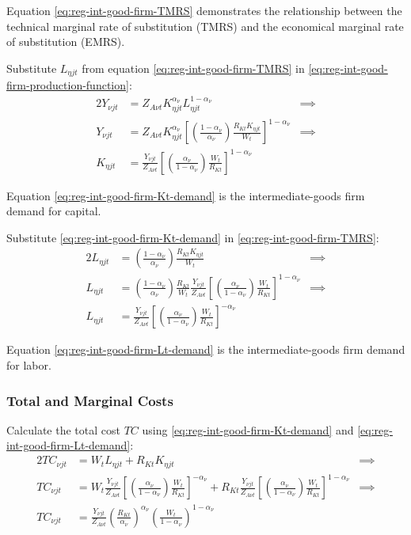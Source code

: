 \documentclass[
thesis.tex
]{subfiles}
\begin{document}
Equation \ref{eq:reg-int-good-firm-TMRS} demonstrates the relationship between the technical marginal rate of substitution (TMRS) and the economical marginal rate of substitution (EMRS). 

Substitute $L_{\eta jt}$ from equation \ref{eq:reg-int-good-firm-TMRS} in \ref{eq:reg-int-good-firm-production-function}:
\begin{alignat}{2}
	Y_{\nu jt} & = Z_{A\nu t} K_{\eta jt}^{\alpha_\nu} L_{\eta jt}^{1-{\alpha_\nu}} &\implies \nonumber \\
	Y_{\nu jt} & = Z_{A\nu t} K_{\eta jt}^{\alpha_\nu} \left[ \left( \frac{1-{\alpha_\nu}}{{\alpha_\nu}} \right) \frac{R_{Kt} K_{\eta jt}}{W_t} \right]^{1-{\alpha_\nu}} &\implies \nonumber \\
	K_{\eta jt} & = \frac{Y_{\nu jt}}{Z_{A\nu t}} \left[ \left( \frac{{\alpha_\nu}}{1-{\alpha_\nu}} \right) \frac{W_t}{R_{Kt}}\right]^{1-{\alpha_\nu}} \label{eq:reg-int-good-firm-Kt-demand}
\end{alignat}

Equation \ref{eq:reg-int-good-firm-Kt-demand} is the intermediate-goods firm demand for capital. 

Substitute \ref{eq:reg-int-good-firm-Kt-demand} in \ref{eq:reg-int-good-firm-TMRS}:
\begin{alignat}{2}
	L_{\eta jt} & = \left( \frac{1-{\alpha_\nu}}{{\alpha_\nu}} \right) \frac{R_{Kt} K_{\eta jt}}{W_t} &\implies \nonumber \\
	L_{\eta jt} & = \left( \frac{1-{\alpha_\nu}}{{\alpha_\nu}} \right) \frac{R_{Kt}}{W_t} \frac{Y_{\nu jt}}{Z_{A\nu t}} \left[ \left( \frac{{\alpha_\nu}}{1-{\alpha_\nu}} \right) \frac{W_t}{R_{Kt}}\right]^{1-{\alpha_\nu}} &\implies \nonumber \\
	L_{\eta jt} & = \frac{Y_{\nu jt}}{Z_{A\nu t}} \left[ \left( \frac{{\alpha_\nu}}{1-{\alpha_\nu}} \right) \frac{W_t}{R_{Kt}}\right]^{-{\alpha_\nu}} \label{eq:reg-int-good-firm-Lt-demand}
\end{alignat}

Equation \ref{eq:reg-int-good-firm-Lt-demand} is the intermediate-goods firm demand for labor.

\subsubsection*{Total and Marginal Costs}

Calculate the total cost $TC$ using \ref{eq:reg-int-good-firm-Kt-demand} and \ref{eq:reg-int-good-firm-Lt-demand}:
\begin{alignat}{2}
	TC_{\nu jt} & = W_t L_{\eta jt} + R_{Kt} K_{\eta jt} &\implies \nonumber \\
	TC_{\nu jt} & = W_t \frac{Y_{\nu jt}}{Z_{A\nu t}} \left[ \left( \frac{{\alpha_\nu}}{1-{\alpha_\nu}} \right) \frac{W_t}{R_{Kt}} \right]^{-{\alpha_\nu}} + R_{Kt} \frac{Y_{\nu jt}}{Z_{A\nu t}} \left[ \left( \frac{{\alpha_\nu}}{1-{\alpha_\nu}} \right) \frac{W_t}{R_{Kt}} \right]^{1-{\alpha_\nu}} &\implies \nonumber \\
	TC_{\nu jt} & = \frac{Y_{\nu jt}}{Z_{A\nu t}} \left( \frac{R_{Kt}}{{\alpha_\nu}} \right)^{{\alpha_\nu}} \left( \frac{W_t}{1-{\alpha_\nu}} \right)^{1-{\alpha_\nu}} \label{eq:reg-int-good-firm-TC}
\end{alignat}
\end{document}
